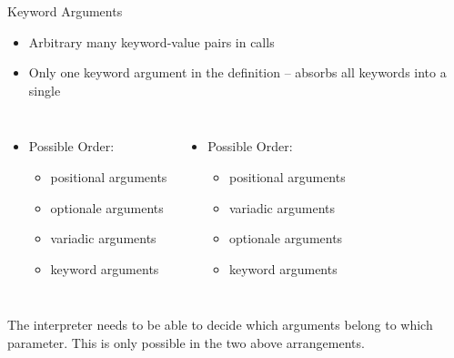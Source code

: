 \begin{frame}{Keyword Arguments}
%
\begin{itemize}
\item Arbitrary many keyword-value pairs in calls
\item Only one keyword argument in the definition -- absorbs all keywords into a single 
\end{itemize}
%
\begin{columns}[T]
\begin{itemize}
\item Possible Order:
	\begin{itemize}
	\item positional arguments
	\item optionale arguments
	\item variadic arguments
	\item keyword arguments
	\end{itemize}
\end{itemize}
%
\begin{itemize}
\item Possible Order:
	\begin{itemize}
	\item positional arguments
	\item variadic arguments
	\item optionale arguments
	\item keyword arguments
	\end{itemize}
\end{itemize}
\end{columns}

%
\begin{hintbox}
The interpreter needs to be able to decide which arguments belong to which parameter. This is only possible in the two above arrangements.
\end{hintbox}
%
\end{frame}


